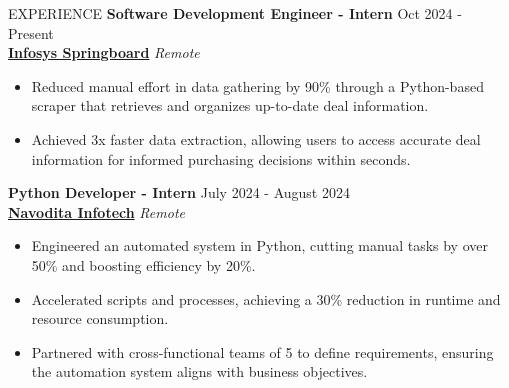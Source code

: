 \documentclass{resume} %
\begin{document}
\begin{rSection}{EXPERIENCE}
\textbf{Software Development Engineer - Intern } \hfill Oct 2024 - Present\\
\textbf{\href{https://www.linkedin.com/company/infosys-springboard/}{Infosys Springboard}}   \hfill \textit{Remote}
 \begin{itemize}
    \itemsep -3pt {} 
     \item Reduced manual effort in data gathering by 90\% through a Python-based scraper that retrieves and organizes up-to-date deal information.
     \item Achieved 3x faster data extraction, allowing users to access accurate deal information for informed purchasing decisions within seconds.
 \end{itemize}
\textbf{Python Developer - Intern } \hfill July 2024 - August 2024\\
\textbf{\href{https://www.linkedin.com/company/navinfotech/}{Navodita Infotech}}   \hfill \textit{Remote}
 \begin{itemize}
    \itemsep -3pt {} 
     \item Engineered an automated system in Python, cutting manual tasks by over 50\% and boosting efficiency by 20\%. 
     \item Accelerated scripts and processes, achieving a 30\% reduction in runtime and resource consumption.
     \item Partnered with cross-functional teams of 5 to define requirements, ensuring the automation system aligns with business objectives.
     
 \end{itemize}



\end{rSection} 

\end{document}
